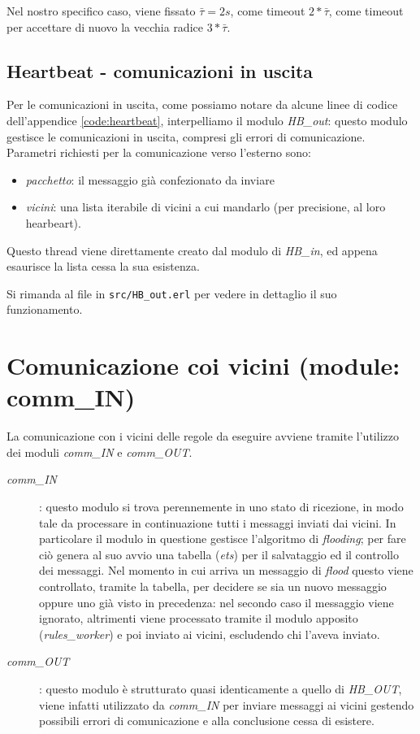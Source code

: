 \documentclass[italian]{memoir}
\begin{document}
Nel nostro specifico caso, viene fissato $\bar{\tau} = 2 s$, come timeout  $2*\bar{\tau}$, come timeout per accettare di nuovo la vecchia radice $3*\bar{\tau}$.

\subsection{Heartbeat - comunicazioni in uscita}
Per le comunicazioni in uscita, come possiamo notare da alcune linee di codice dell'appendice \ref{code:heartbeat}, interpelliamo il modulo \textit{HB\_out}: questo modulo gestisce le comunicazioni in uscita, compresi gli errori di comunicazione. Parametri richiesti per la comunicazione verso l'esterno sono:
\begin{itemize}
\item \textit{pacchetto}: il messaggio già confezionato da inviare
\item \textit{vicini}: una lista iterabile di vicini a cui mandarlo (per precisione, al loro hearbeart).
\end{itemize}
Questo thread viene direttamente creato dal modulo di \textit{HB\_in}, ed appena esaurisce la lista cessa la sua esistenza.

Si rimanda al file in \texttt{src/HB\_out.erl} per vedere in dettaglio il suo funzionamento.

\section{Comunicazione coi vicini (module: comm\_IN)}

La comunicazione con i vicini delle regole da eseguire avviene tramite l'utilizzo dei moduli \textit{comm\_IN} e \textit{comm\_OUT}.
\begin{description}
\item[\textit{comm\_IN}]: questo modulo si trova perennemente in uno stato di ricezione, in modo tale da processare in continuazione tutti i messaggi inviati dai vicini. In particolare il modulo in questione gestisce l'algoritmo di \textit{flooding}; per fare ciò genera al suo avvio una tabella (\textit{ets}) per il salvataggio ed il controllo dei messaggi. Nel momento in cui arriva un messaggio di \textit{flood} questo viene controllato, tramite la tabella, per decidere se sia un nuovo messaggio oppure uno già visto in precedenza: nel secondo caso il messaggio viene ignorato, altrimenti viene processato tramite il modulo apposito (\textit{rules\_worker}) e poi inviato ai vicini, escludendo chi l'aveva inviato.
\item[\textit{comm\_OUT}]: questo modulo è strutturato quasi identicamente a quello di \textit{HB\_OUT}, viene infatti utilizzato da \textit{comm\_IN} per inviare messaggi ai vicini gestendo possibili errori di comunicazione e alla conclusione cessa di esistere.
\end{description}
\end{document}
